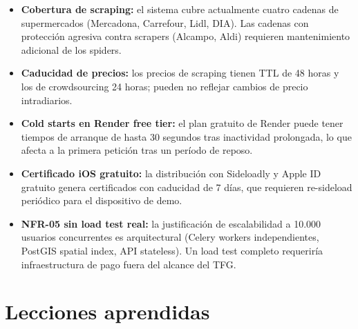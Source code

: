 \begin{itemize}
  \item \textbf{Cobertura de scraping:} el sistema cubre actualmente cuatro cadenas de
    supermercados (Mercadona, Carrefour, Lidl, DIA). Las cadenas con protecci\'on agresiva contra
    scrapers (Alcampo, Aldi) requieren mantenimiento adicional de los spiders.

  \item \textbf{Caducidad de precios:} los precios de scraping tienen TTL de 48 horas y los de
    crowdsourcing 24 horas; pueden no reflejar cambios de precio intradiarios.

  \item \textbf{Cold starts en Render free tier:} el plan gratuito de Render puede tener tiempos
    de arranque de hasta 30 segundos tras inactividad prolongada, lo que afecta a la primera
    petici\'on tras un per\'iodo de reposo.

  \item \textbf{Certificado iOS gratuito:} la distribuci\'on con Sideloadly y Apple ID gratuito
    genera certificados con caducidad de 7 d\'ias, que requieren re-sideload peri\'odico para el
    dispositivo de demo.

  \item \textbf{NFR-05 sin load test real:} la justificaci\'on de escalabilidad a 10.000 usuarios
    concurrentes es arquitectural (Celery workers independientes, PostGIS spatial index, API
    stateless). Un load test completo requeriría infraestructura de pago fuera del alcance del TFG.
\end{itemize}

\section{Lecciones aprendidas}\label{sec:lecciones}

